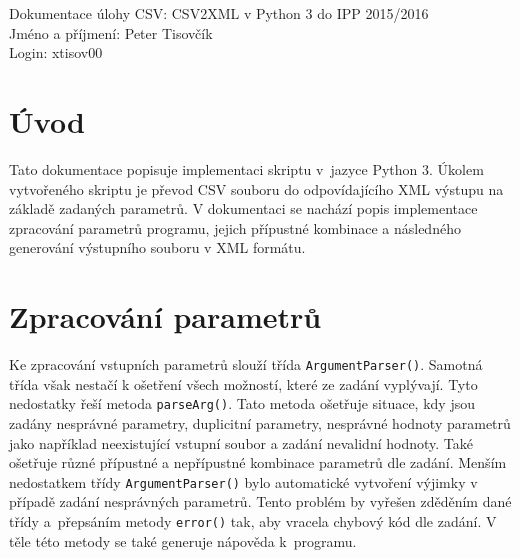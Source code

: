 \documentclass[10pt,a4paper,final]{article}
\begin{document}

  \pagestyle{plain}
  \setcounter{page}{1}
  
  \setlength{\parindent}{1cm}
  \setlength{\parskip}{0.5cm plus4mm minus3mm}
  
  \noindent
  Dokumentace úlohy CSV: CSV2XML v Python 3 do IPP 2015/2016 \\
  Jméno a příjmení: Peter Tisovčík \\
  Login: xtisov00 \\
  


  \section{Úvod} \label{uvod}

Tato dokumentace popisuje implementaci skriptu v~jazyce Python 3. Úkolem vytvořeného skriptu je převod CSV souboru do odpovídajícího XML výstupu na základě zadaných parametrů. V dokumentaci se nachází popis implementace zpracování parametrů programu, jejich přípustné kombinace a následného generování výstupního souboru v XML formátu.

  \section{Zpracování parametrů} \label{zpracovani-parametru}

Ke zpracování vstupních parametrů slouží třída \texttt{ArgumentParser()}. Samotná třída však nestačí k ošetření všech možností, které ze zadání vyplývají. Tyto nedostatky řeší metoda \texttt{parseArg()}. Tato metoda ošetřuje situace, kdy jsou zadány nesprávné parametry, duplicitní parametry, nesprávné hodnoty parametrů jako například neexistující vstupní soubor a zadání nevalidní hodnoty. Také ošetřuje různé přípustné a nepřípustné kombinace parametrů dle zadání. Menším nedostatkem třídy \texttt{ArgumentParser()} bylo automatické vytvoření výjimky v případě zadání nesprávných parametrů. Tento problém by vyřešen zděděním dané třídy a~přepsáním metody \texttt{error()} tak, aby vracela chybový kód dle zadání. V těle této metody se také generuje nápověda k~programu. 
	
\end{document}
